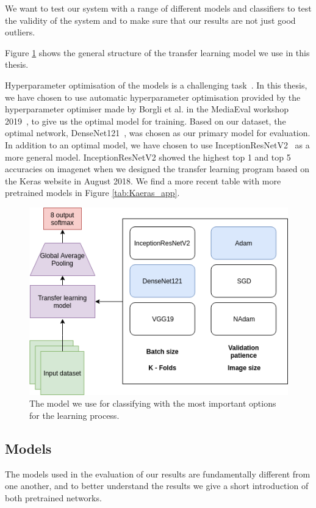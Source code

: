We want to test our system with a range of different models and classifiers to test the validity of the system and to make sure that our results are not just good outliers.

Figure \ref{fig:KTLmodel} shows the general structure of the transfer learning model we use in this thesis. 

Hyperparameter optimisation of the models is a challenging task~\cite{runeMedico2018}. In this thesis, we have chosen to use automatic hyperparameter optimisation provided by the hyperparameter optimiser made by Borgli et al. in the MediaEval workshop 2019~\cite{runeMedico2018}, to give us the optimal model for training. Based on our dataset, the optimal network, DenseNet121~\cite{DBLP:journals/corr/HuangLW16a}, was chosen as our primary model for evaluation. 
In addition to an optimal model, we have chosen to use InceptionResNetV2~\cite{DBLP:journals/corr/SzegedyIV16} as a more general model. InceptionResNetV2 showed the highest top 1 and top 5 accuracies on imagenet when we designed the transfer learning program based on the Keras website in August 2018. We find a more recent table with more pretrained models in Figure \ref{tab:Kaeras_app}.


\begin{figure}[t]
        \centering
        \includegraphics[scale=0.47]{methodology/figures/model.png}
        \caption{ The model we use for classifying with the most important options for the learning process. }
    \label{fig:KTLmodel}
\end{figure}



\subsection{Models}
The models used in the evaluation of our results are fundamentally different from one another, and to better understand the results we give a short introduction of both pretrained networks. 

